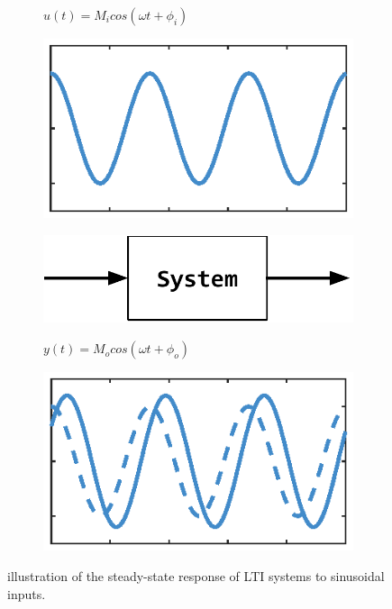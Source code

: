 \documentclass[a4paper,11pt]{book}
\numberwithin{figure}{chapter}
\numberwithin{equation}{chapter}
\numberwithin{table}{chapter}
\theoremstyle{definition}
\begin{document}
\begin{figure}[ht] 
	\centering
	\begin{subfigure}{0.25\textwidth}	
		\centering
		$u(t) = M_i cos(\omega t + \phi_i)$\par\medskip
		\includegraphics[scale=0.55]{chapter2/freq01_1}
	\end{subfigure}
	\begin{subfigure}{0.38\textwidth}	
		\centering
		\includegraphics[scale=0.6]{chapter2/freq01_2}
	\end{subfigure}
	\begin{subfigure}{0.25\textwidth}	
		\centering
		$y(t) = M_o cos(\omega t + \phi_o)$\par\medskip
		\includegraphics[scale=0.55]{chapter2/freq01_3}
	\end{subfigure}
	
	\caption{illustration of the steady-state response of LTI systems to sinusoidal inputs.}
	\label{fig:freq01}
\end{figure}
\end{document}
